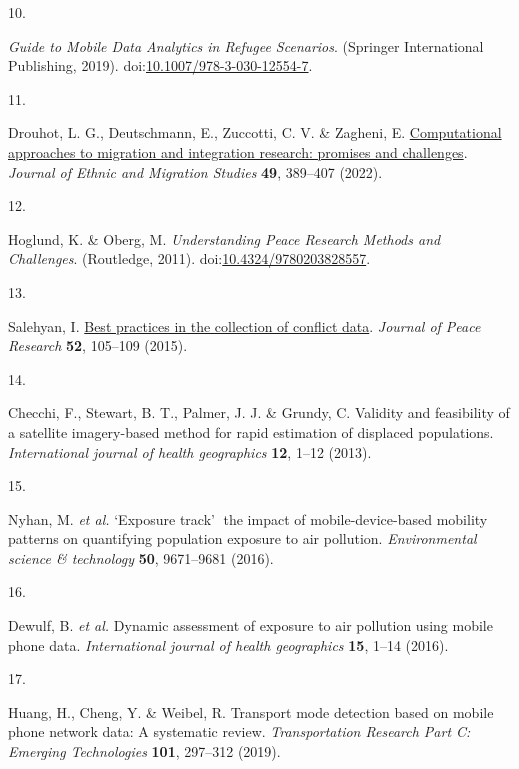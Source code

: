 \documentclass[
  11pt,
]{article}
\newlength{\cslhangindent}
\newlength{\csllabelwidth}
\newenvironment{CSLReferences}[2] %
 {\begin{list}{}{%
  \setlength{\itemindent}{0pt}
  \setlength{\leftmargin}{0pt}
  \setlength{\parsep}{0pt}
  \ifodd #1
   \setlength{\leftmargin}{\cslhangindent}
   \setlength{\itemindent}{-1\cslhangindent}
  \fi
  \setlength{\itemsep}{#2\baselineskip}}}
 {\end{list}}
\newcommand{\CSLLeftMargin}[1]{\parbox[t]{\csllabelwidth}{\strut#1\strut}}
\newcommand{\CSLRightInline}[1]{\parbox[t]{\linewidth - \csllabelwidth}{\strut#1\strut}}
\begin{document}
\begin{CSLReferences}{0}{0}
\CSLLeftMargin{10. }%
\CSLRightInline{\emph{Guide to Mobile Data Analytics in Refugee
Scenarios}. (Springer International Publishing, 2019).
doi:\href{https://doi.org/10.1007/978-3-030-12554-7}{10.1007/978-3-030-12554-7}.}

\CSLLeftMargin{11. }%
\CSLRightInline{Drouhot, L. G., Deutschmann, E., Zuccotti, C. V. \&
Zagheni, E.
\href{https://doi.org/10.1080/1369183x.2022.2100542}{Computational
approaches to migration and integration research: promises and
challenges}. \emph{Journal of Ethnic and Migration Studies} \textbf{49},
389--407 (2022).}

\CSLLeftMargin{12. }%
\CSLRightInline{Hoglund, K. \& Oberg, M. \emph{Understanding Peace
Research Methods and Challenges}. (Routledge, 2011).
doi:\href{https://doi.org/10.4324/9780203828557}{10.4324/9780203828557}.}

\CSLLeftMargin{13. }%
\CSLRightInline{Salehyan, I.
\href{https://doi.org/10.1177/0022343314551563}{Best practices in the
collection of conflict data}. \emph{Journal of Peace Research}
\textbf{52}, 105--109 (2015).}

\CSLLeftMargin{14. }%
\CSLRightInline{Checchi, F., Stewart, B. T., Palmer, J. J. \& Grundy, C.
Validity and feasibility of a satellite imagery-based method for rapid
estimation of displaced populations. \emph{International journal of
health geographics} \textbf{12}, 1--12 (2013).}

\CSLLeftMargin{15. }%
\CSLRightInline{Nyhan, M. \emph{et al.} {`Exposure track'} the impact
of mobile-device-based mobility patterns on quantifying population
exposure to air pollution. \emph{Environmental science \& technology}
\textbf{50}, 9671--9681 (2016).}

\CSLLeftMargin{16. }%
\CSLRightInline{Dewulf, B. \emph{et al.} Dynamic assessment of exposure
to air pollution using mobile phone data. \emph{International journal of
health geographics} \textbf{15}, 1--14 (2016).}

\CSLLeftMargin{17. }%
\CSLRightInline{Huang, H., Cheng, Y. \& Weibel, R. Transport mode
detection based on mobile phone network data: A systematic review.
\emph{Transportation Research Part C: Emerging Technologies}
\textbf{101}, 297--312 (2019).}


\end{CSLReferences}
\end{document}

